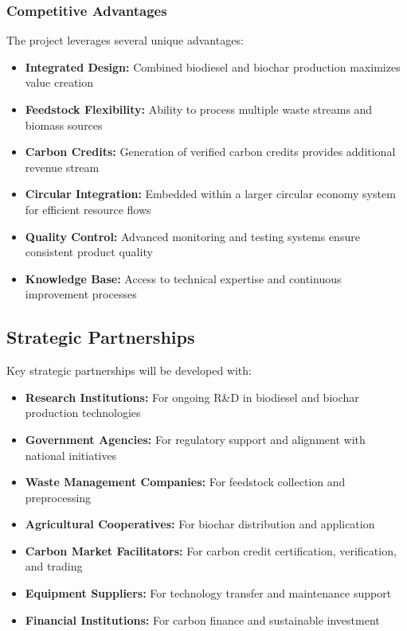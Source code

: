 \subsubsection{Competitive Advantages}
The project leverages several unique advantages:

\begin{itemize}
    \item \textbf{Integrated Design:} Combined biodiesel and biochar production maximizes value creation
    \item \textbf{Feedstock Flexibility:} Ability to process multiple waste streams and biomass sources
    \item \textbf{Carbon Credits:} Generation of verified carbon credits provides additional revenue stream
    \item \textbf{Circular Integration:} Embedded within a larger circular economy system for efficient resource flows
    \item \textbf{Quality Control:} Advanced monitoring and testing systems ensure consistent product quality
    \item \textbf{Knowledge Base:} Access to technical expertise and continuous improvement processes
\end{itemize}

\subsection{Strategic Partnerships}

Key strategic partnerships will be developed with:

\begin{itemize}
    \item \textbf{Research Institutions:} For ongoing R\&D in biodiesel and biochar production technologies
    \item \textbf{Government Agencies:} For regulatory support and alignment with national initiatives
    \item \textbf{Waste Management Companies:} For feedstock collection and preprocessing
    \item \textbf{Agricultural Cooperatives:} For biochar distribution and application
    \item \textbf{Carbon Market Facilitators:} For carbon credit certification, verification, and trading
    \item \textbf{Equipment Suppliers:} For technology transfer and maintenance support
    \item \textbf{Financial Institutions:} For carbon finance and sustainable investment
\end{itemize}

